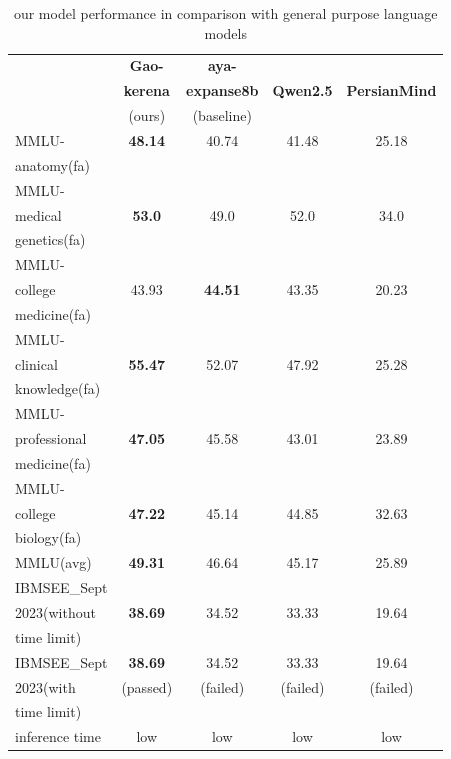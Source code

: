 \documentclass[conference]{IEEEtran}
\begin{document}
\begin{table}[ht]
	\centering
	\caption{
		our model performance 
		in comparison with general purpose language models
		}
	\begin{tabular}{|l|c|c|c|c|}  %
		\hline
		\textbf{} & \textbf{Gao-} & \textbf{aya-} &  &  \\ 
		 & \textbf{kerena} & \textbf{expanse8b} & \textbf{Qwen2.5} & \textbf{PersianMind} \\
		 & (ours) & (baseline) &  &  \\ \hline
		MMLU- & \textbf{48.14} & 40.74 & 41.48 & 25.18 \\ 
		anatomy(fa) &  &  &  &  \\ \hline
		MMLU- &  &  &  &  \\
		medical & \textbf{53.0} & 49.0 & 52.0 & 34.0 \\ 
		genetics(fa) &  &  &  &  \\ \hline
		MMLU- &  &  &  &  \\
		college & 43.93 & \textbf{44.51} & 43.35 & 20.23 \\
		medicine(fa) &  &  &  &  \\ \hline
		MMLU- &  &  &  &  \\
		clinical& \textbf{55.47} & 52.07 & 47.92 & 25.28 \\
		knowledge(fa)&  &  &  &  \\ \hline
		MMLU- &  &  &  &  \\
        professional& \textbf{47.05} & 45.58 & 43.01 & 23.89 \\ 
        medicine(fa)&  &  &  &  \\ \hline
        MMLU- &  &  &  &  \\
        college& \textbf{47.22} & 45.14 & 44.85 & 32.63 \\
        biology(fa)&  &  &  &  \\ \hline
        MMLU(avg) & \textbf{49.31} & 46.64 & 45.17 & 25.89 \\ \hline
		IBMSEE\_Sept &  &  &  &  \\ 
        2023(without & \textbf{38.69} & 34.52 & 33.33 & 19.64 \\  
         time limit) &  &  &  &  \\  \hline
        IBMSEE\_Sept & \textbf{38.69} & 34.52 & 33.33 & 19.64 \\ 
        2023(with & (passed) & (failed) & (failed) & (failed) \\  
        time limit) &  &  &  &  \\  \hline
        inference time & low & low & low & low \\  \hline
	\end{tabular}
	\label{tab:model_results_on_mcqa}
\end{table}
\end{document}
